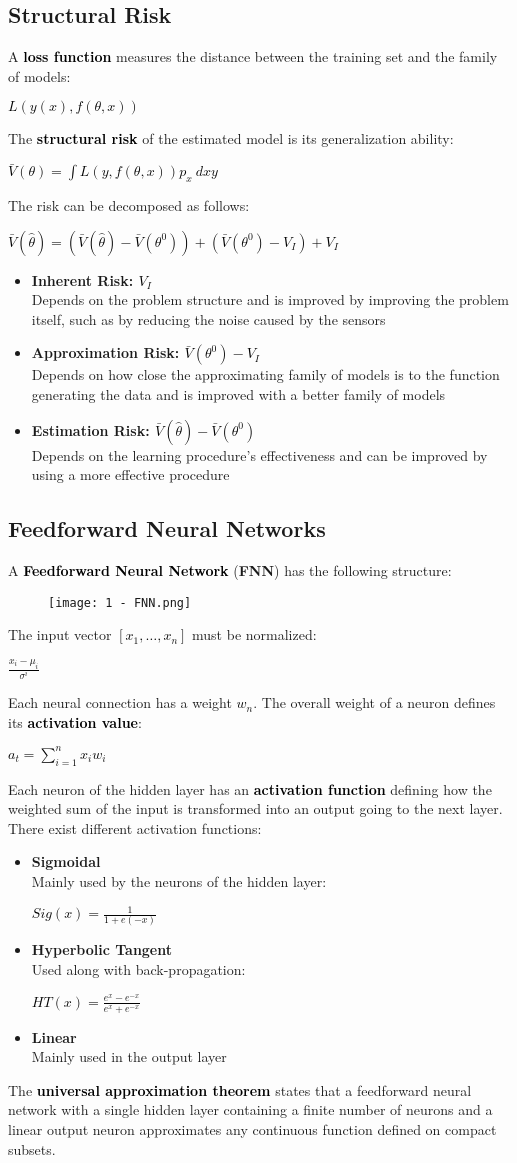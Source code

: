 \documentclass{article}
\newcommand{\bb}[1]{\textcolor{black}{\textbf{#1}}}
\newcommand{\rr}[1]{\textcolor{black}{#1}}
\newcommand{\cc}[1]{\begin{center}\textcolor{black}{#1}\end{center}}
\newcommand{\concept}[1]{\textbf{#1}\vspace{0.2cm}\\}
\begin{document}
\subsection{Structural Risk}
A \bb{loss function} measures the distance between the training set and the family of models:
\cc{$L(y(x), f(\theta, x))$}
The \bb{structural risk} of the estimated model is its generalization ability:
\cc{$\bar{V}(\theta) = \displaystyle\int L(y,f(\theta, x))p_x \ dxy$}
The risk can be decomposed as follows:
\cc{$\bar{V}(\hat{\theta}) = (\bar{V}(\hat{\theta}) - \bar{V}(\theta^0)) + (\bar{V}(\theta^0) - V_I) + V_I$}
\begin{itemize}
    \item \concept{Inherent Risk: \rr{$V_I$}}
        Depends on the problem structure and is improved by improving the problem itself, such as by reducing the noise caused by the sensors
    \item \concept{Approximation Risk: \rr{$\bar{V}(\theta^0) - V_I$}} 
        Depends on how close the approximating family of models is to the function generating the data and is improved with a better family of models
    \item \concept{Estimation Risk: \rr{$\bar{V}(\hat{\theta}) - \bar{V}(\theta^0)$}}
        Depends on the learning procedure's effectiveness and can be improved by using a more effective procedure
\end{itemize}

\subsection{Feedforward Neural Networks}
A \bb{Feedforward Neural Network} (\textbf{FNN}) has the following structure:
\begin{figure}[H]
    \centering
    \texttt{[image: 1 - FNN.png]}
\end{figure}
The input vector \rr{$[x_1, \dots, x_n]$} must be normalized:
\cc{$\displaystyle\frac{x_i - \mu_i}{\sigma^i}$}
Each neural connection has a weight \rr{$w_n$}. The overall weight of a neuron defines its \bb{activation value}:
\cc{$a_t = \displaystyle\sum^n_{i=1}x_iw_i$}
Each neuron of the hidden layer has an \bb{activation function} defining how the weighted sum of the input is transformed into an output going to the next layer. There exist different activation functions:
\begin{itemize}
    \item \concept{Sigmoidal}
        Mainly used by the neurons of the hidden layer:
            \cc{$Sig(x) = \displaystyle\frac{1}{1+e(-x)}$}
    \item \concept{Hyperbolic Tangent}
        Used along with back-propagation:
            \cc{$HT(x) = \displaystyle\frac{e^x-e^{-x}}{e^x+e^{-x}}$}
    \item \concept{Linear}
        Mainly used in the output layer
\end{itemize}
The \bb{universal approximation theorem} states that a feedforward neural network with a single hidden layer containing a finite number of neurons and a linear output neuron approximates any continuous function defined on compact subsets.
\end{document}
